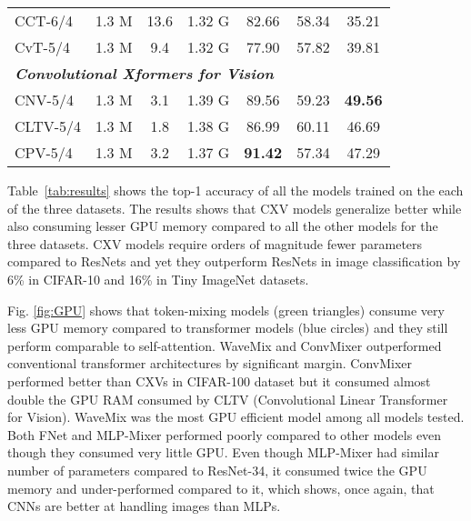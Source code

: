 \documentclass{article}
\begin{document}
\begin{table*}[h]
\begin{tabular}{lcccccc}
\multicolumn{1}{l|}{CCT-6/4}         & 1.3 M  & 13.6         & \multicolumn{1}{c|}{1.32 G} & 82.66 & 58.34          & 35.21 \\
\multicolumn{1}{l|}{CvT-5/4}         & 1.3 M  & 9.4          & \multicolumn{1}{c|}{1.32 G} & 77.90 & 57.82          & 39.81          \\ \midrule
\multicolumn{7}{l}{\textit{\textbf{Convolutional Xformers for Vision}}}                                                              \\ \midrule
\multicolumn{1}{l|}{CNV-5/4} &
  1.3 M &
  3.1 &
  \multicolumn{1}{c|}{1.39 G} &
  89.56 &
  59.23 &
 \textbf{49.56} \\
\multicolumn{1}{l|}{CLTV-5/4} &
  1.3 M &
  1.8 &
  \multicolumn{1}{l|}{1.38 G} &
  86.99 &
  60.11 &
  46.69 \\
\multicolumn{1}{l|}{CPV-5/4} &
  1.3 M &
  3.2 &
  \multicolumn{1}{c|}{1.37 G} &
  \textbf{91.42} &
  57.34 &
  47.29 \\ \bottomrule
\end{tabular}

\caption{Comparison of top-1 accuracy and computational costs for all the models in image classification using different datasets. The GPU consumption shown is for a batch size of 32. Warm up and data augmentations were not used for training.}
\label{tab:results}
\end{table*}

Table~\ref{tab:results} shows the top-1 accuracy of all the models trained on the each of the three datasets. The results shows that CXV models generalize better while also consuming lesser GPU memory compared to all the other models for the  three datasets. CXV models require orders of magnitude fewer parameters compared to ResNets and yet they outperform ResNets in image classification by 6\% in CIFAR-10 and 16\% in Tiny ImageNet datasets. 

Fig. \ref{fig:GPU} shows that token-mixing models (green triangles) consume very less GPU memory compared to transformer models (blue circles) and they still perform comparable to self-attention. WaveMix and ConvMixer outperformed conventional transformer architectures by significant margin. ConvMixer performed better than CXVs in CIFAR-100 dataset but it consumed almost double the GPU RAM consumed by CLTV (Convolutional Linear Transformer for Vision). WaveMix was the most GPU efficient model among all models tested. Both FNet and MLP-Mixer performed poorly compared to other models even though they consumed very little GPU. Even though MLP-Mixer had similar number of parameters compared to ResNet-34, it consumed twice the GPU memory and under-performed compared to it, which shows, once again, that CNNs are better at handling images than MLPs.
\end{document}
